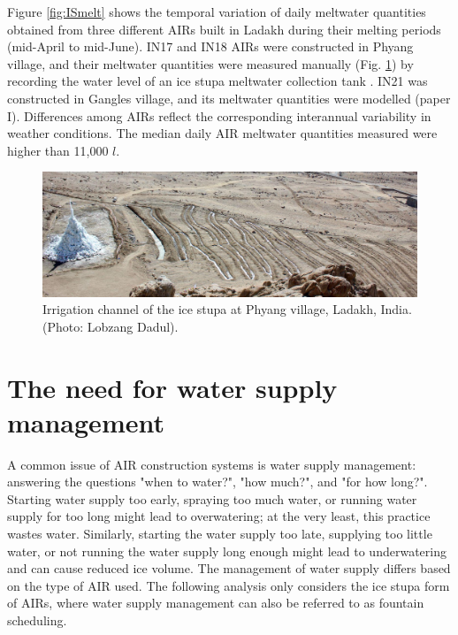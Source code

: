 Figure \ref{fig:ISmelt} shows the temporal variation of daily meltwater quantities obtained from three different
AIRs built in Ladakh during their melting periods (mid-April to mid-June). IN17 and IN18 \ac{AIRs} were constructed
in Phyang village, and their meltwater quantities were measured manually (Fig. \ref{fig:ISirrigation}) by recording the water level of an ice stupa meltwater collection tank
\citep{vermaIceStupaMeltwater2018}. IN21 was constructed in Gangles village, and its meltwater quantities
were modelled (paper I). Differences among \ac{AIRs} reflect the corresponding interannual variability in weather
conditions. The median daily \ac{AIR} meltwater quantities measured were higher than 11,000 $l$.

\begin{figure}
	\centering
	\includegraphics[width=\textwidth]{figs/IS_irrigation.jpeg}
	\caption{Irrigation channel of the ice stupa at Phyang village, Ladakh, India. (Photo: Lobzang Dadul). }
	\label{fig:ISirrigation}
\end{figure}

\section{The need for water supply management}

A common issue of \ac{AIR} construction systems is water supply management: answering the questions "when to
water?", "how much?", and "for how long?". Starting water supply too early, spraying too much water, or
running water supply for too long might lead to overwatering; at the very least, this practice wastes water.
Similarly, starting the water supply too late, supplying too little water, or not running the water supply long
enough might lead to underwatering and can cause reduced ice volume. The management of water supply
differs based on the type of \ac{AIR} used. The following analysis only considers the ice stupa
form of \ac{AIRs}, where water supply management can also be referred to as fountain scheduling.

